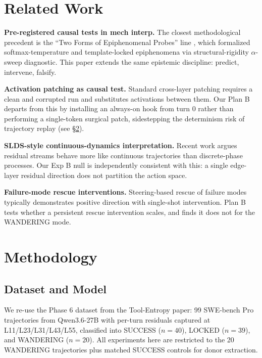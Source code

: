 \documentclass[11pt]{article}
\begin{document}
\section{Related Work}

\textbf{Pre-registered causal tests in mech interp.} The closest methodological precedent is the ``Two Forms of Epiphenomenal Probes'' line \cite{two_forms_2026}, which formalized softmax-temperature and template-locked epiphenomena via structural-rigidity $\alpha$-sweep diagnostic. This paper extends the same epistemic discipline: predict, intervene, falsify.

\textbf{Activation patching as causal test.} Standard cross-layer patching \cite{geiger_2023_interchange,heimersheim_2024_patching} requires a clean and corrupted run and substitutes activations between them. Our Plan B departs from this by installing an always-on hook from turn 0 rather than performing a single-token surgical patch, sidestepping the determinism risk of trajectory replay (see \S\ref{sec:methodology}).

\textbf{SLDS-style continuous-dynamics interpretation.} Recent work \cite{vicentino_slds_2026} argues residual streams behave more like continuous trajectories than discrete-phase processes. Our Exp B null is independently consistent with this: a single edge-layer residual direction does not partition the action space.

\textbf{Failure-mode rescue interventions.} Steering-based rescue of failure modes \cite{turner_2023_steering, anthropic_steering_2024} typically demonstrates positive direction with single-shot intervention. Plan B tests whether a persistent rescue intervention scales, and finds it does not for the WANDERING mode.

\section{Methodology}\label{sec:methodology}

\subsection{Dataset and Model}

We re-use the Phase 6 dataset from the Tool-Entropy paper: 99 SWE-bench Pro trajectories from Qwen3.6-27B with per-turn residuals captured at L11/L23/L31/L43/L55, classified into SUCCESS ($n=40$), LOCKED ($n=39$), and WANDERING ($n=20$). All experiments here are restricted to the 20 WANDERING trajectories plus matched SUCCESS controls for donor extraction.
\end{document}
